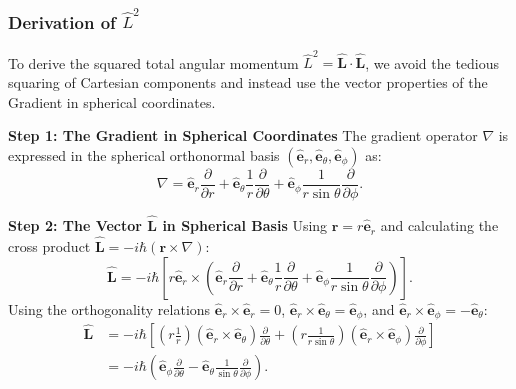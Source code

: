 \subsubsection{Derivation of $\hat{L}^2$}
To derive the squared total angular momentum $\hat{L}^2 = \hat{\mathbf{L}} \cdot \hat{\mathbf{L}}$, we avoid the tedious squaring of Cartesian components and instead use the vector properties of the Gradient in spherical coordinates.

\textbf{Step 1: The Gradient in Spherical Coordinates}
The gradient operator $\nabla$ is expressed in the spherical orthonormal basis $(\hat{\mathbf{e}}_r, \hat{\mathbf{e}}_\theta, \hat{\mathbf{e}}_\phi)$ as:
\begin{equation}
    \nabla = \hat{\mathbf{e}}_r \frac{\partial}{\partial r} + \hat{\mathbf{e}}_\theta \frac{1}{r} \frac{\partial}{\partial \theta} + \hat{\mathbf{e}}_\phi \frac{1}{r \sin\theta} \frac{\partial}{\partial \phi}.
\end{equation}

\textbf{Step 2: The Vector $\hat{\mathbf{L}}$ in Spherical Basis}
Using $\mathbf{r} = r \hat{\mathbf{e}}_r$ and calculating the cross product $\hat{\mathbf{L}} = -i\hbar (\mathbf{r} \times \nabla)$:
\begin{equation}
    \hat{\mathbf{L}} = -i\hbar \left[ r\hat{\mathbf{e}}_r \times \left( \hat{\mathbf{e}}_r \frac{\partial}{\partial r} + \hat{\mathbf{e}}_\theta \frac{1}{r} \frac{\partial}{\partial \theta} + \hat{\mathbf{e}}_\phi \frac{1}{r \sin\theta} \frac{\partial}{\partial \phi} \right) \right].
\end{equation}
Using the orthogonality relations $\hat{\mathbf{e}}_r \times \hat{\mathbf{e}}_r = 0$, $\hat{\mathbf{e}}_r \times \hat{\mathbf{e}}_\theta = \hat{\mathbf{e}}_\phi$, and $\hat{\mathbf{e}}_r \times \hat{\mathbf{e}}_\phi = -\hat{\mathbf{e}}_\theta$:
\begin{align}
    \hat{\mathbf{L}} &= -i\hbar \left[ \left( r \frac{1}{r} \right) (\hat{\mathbf{e}}_r \times \hat{\mathbf{e}}_\theta) \frac{\partial}{\partial \theta} + \left( r \frac{1}{r \sin\theta} \right) (\hat{\mathbf{e}}_r \times \hat{\mathbf{e}}_\phi) \frac{\partial}{\partial \phi} \right] \nonumber \\
    &= -i\hbar \left( \hat{\mathbf{e}}_\phi \frac{\partial}{\partial \theta} - \hat{\mathbf{e}}_\theta \frac{1}{\sin\theta} \frac{\partial}{\partial \phi} \right). \label{eq:L_vector_spherical}
\end{align}

